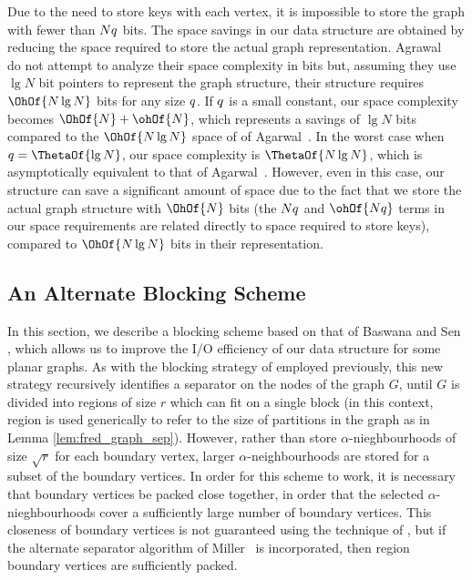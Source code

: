 {Due to the need to store keys with each vertex, it is impossible to
store the graph with fewer than $Nq$ bits.  The space savings in our
data structure are obtained by reducing the space required to store
the actual graph representation.
Agrawal~\etal~\cite{DBLP:conf/soda/AgarwalAMVV98} do not attempt to
analyze their space complexity in bits but, assuming they use
$\lg{N}$ bit pointers to represent the graph structure, their
structure requires $\OhOf{N \lg{N}}$ bits for any size $q$. If $q$ is
a small constant, our space complexity becomes $\OhOf{N} +
\ohOf{N}$, which represents a savings of $\lg{N}$ bits compared to
the $\OhOf{N \lg{N}}$ space of of Agarwal~\etal. In the worst case
when $\bitsPerKey = \ThetaOf{\lg{N}}$, our space complexity is 
$\ThetaOf{N \lg{N}}$, which is asymptotically equivalent to that of
Agarwal~\etal. 
However, even in this case, our structure can save a
significant amount of space due to the fact that we store the actual
graph structure with $\OhOf{N}$ bits (the $Nq$ and $\ohOf{N\bitsPerKey}$
terms in our space requirements are related directly to space required
to store keys), compared to $\OhOf{N \lg{N}}$ bits in their
representation.

\subsection{An Alternate Blocking Scheme}\label{sec:alt_block_scheme}

In this section, we describe a blocking scheme based on that
of Baswana and Sen \cite{DBLP:journals/algorithmica/BaswanaS02}, which
allows us to improve the I/O efficiency of our data structure for some
planar graphs. 
As with the blocking strategy of
\cite{DBLP:conf/soda/AgarwalAMVV98} employed previously, this new
strategy recursively identifies a separator on the nodes of the graph
$G$, until $G$ is divided into regions of size $r$ which can fit on a
single block (in this context, region is used generically to refer to
the size of partitions in the graph as in Lemma
\ref{lem:fred_graph_sep}). However, rather than store
$\alpha$-nieghbourhoods of size $\sqrt{r}$ for each boundary vertex,
larger $\alpha$-neighbourhoods are stored for a subset of the boundary
vertices. 
In order for this scheme to work, it is necessary that
boundary vertices be packed close together, in order that the selected
$\alpha$-nieghbourhoods cover a sufficiently large number of boundary
vertices. This closeness of boundary vertices is not guaranteed using
the technique of \cite{DBLP:conf/soda/AgarwalAMVV98}, but if the
alternate separator algorithm of Miller~\cite{miller_1986} is
incorporated, then region boundary vertices are sufficiently packed.

}
